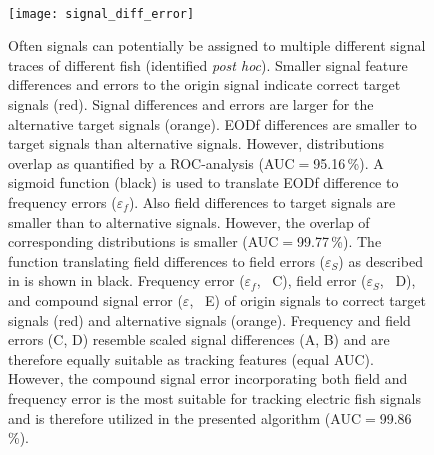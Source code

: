 \begin{figure}[t]
  \begin{minipage}[t]{0.4\textwidth}\mbox{}\\[-2ex]
    \texttt{[image: signal\_diff\_error]}
  \end{minipage}
  \hfill
  \begin{minipage}[t]{0.35\textwidth}
  \caption{\label{signal_diff_error} Often signals can potentially be assigned to multiple different signal traces of different fish (identified \textit{post hoc}). Smaller signal feature differences and errors to the origin signal indicate correct target signals (red). Signal differences and errors are larger for the alternative target signals (orange).  EODf differences are smaller to target signals than alternative signals. However, distributions overlap as quantified by a ROC-analysis (AUC$=$95.16\,\%). A sigmoid function (black) is used to translate EODf difference to frequency errors ($\varepsilon_{f}$).  Also field differences to target signals are smaller than to alternative signals. However, the overlap of corresponding distributions is smaller (AUC$=$99.77\,\%). The function translating field differences to field errors ($\varepsilon_{S}$) as described in  is shown in black.  Frequency error ($\varepsilon_{f}$, \panel~C), field error ($\varepsilon_{S}$, \panel~D), and compound signal error ($\varepsilon$, \panel~E) of origin signals to correct target signals (red) and alternative signals (orange). Frequency and field errors (C, D) resemble scaled signal differences (A, B) and are therefore equally suitable as tracking features (equal AUC). However, the compound signal error incorporating both field and frequency error is the most suitable for tracking electric fish signals and is therefore utilized in the presented algorithm (AUC$=$99.86\,\%).
  }
  \end{minipage}
\end{figure}


